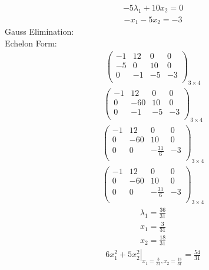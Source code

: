 \documentclass{article}
\begin{document}
\begin{align*}
-5\lambda_{1} + 10x_{2}=0\end{align*}
\begin{align*}
-x_{1} - 5x_{2}=-3\end{align*}
Gauss Elimination:\\
Echelon Form:\\
\begin{align*}
\left(
\begin{array}{ccc|c}
-1 & 12 & 0 & 0\\
-5 & 0 & 10 & 0\\
0 & -1 & -5 & -3\\
\end{array}
\right)_{3\times 4}
\end{align*}
\begin{align*}
\left(
\begin{array}{ccc|c}
-1 & 12 & 0 & 0\\
0 & -60 & 10 & 0\\
0 & -1 & -5 & -3\\
\end{array}
\right)_{3\times 4}
\end{align*}
\begin{align*}
\left(
\begin{array}{ccc|c}
-1 & 12 & 0 & 0\\
0 & -60 & 10 & 0\\
0 & 0 & -\frac{31}{6} & -3\\
\end{array}
\right)_{3\times 4}
\end{align*}
\begin{align*}
\left(
\begin{array}{ccc|c}
-1 & 12 & 0 & 0\\
0 & -60 & 10 & 0\\
0 & 0 & -\frac{31}{6} & -3\\
\end{array}
\right)_{3\times 4}
\end{align*}
\begin{align*}
\lambda_{1}=\frac{36}{31}\end{align*}
\begin{align*}
x_{1}=\frac{3}{31}\end{align*}
\begin{align*}
x_{2}=\frac{18}{31}\end{align*}
\begin{align*}
\left.6x_{1}^{2} + 5x_{2}^{2}\right|_{x_{1}=\frac{3}{31},x_{2}=\frac{18}{31}}=\frac{54}{31}\end{align*}
\end{document}
